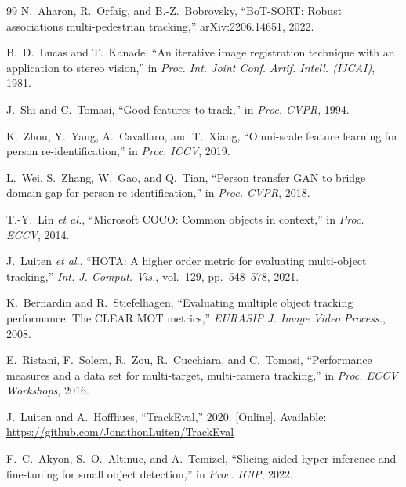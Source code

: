 \documentclass[fontsize=13pt,a4paper,oneside,parskip=false,numbers=noenddot,bibliography=totoc]{scrreprt}
\begin{document}
\begin{thebibliography}{99}
N.~Aharon, R.~Orfaig, and B.-Z.~Bobrovsky, ``BoT-SORT: Robust associations multi-pedestrian tracking,'' arXiv:2206.14651, 2022.

B.~D.~Lucas and T.~Kanade, ``An iterative image registration technique with an application to stereo vision,'' in \textit{Proc. Int. Joint Conf. Artif. Intell. (IJCAI)}, 1981.

J.~Shi and C.~Tomasi, ``Good features to track,'' in \textit{Proc. CVPR}, 1994.

K.~Zhou, Y.~Yang, A.~Cavallaro, and T.~Xiang, ``Omni-scale feature learning for person re-identification,'' in \textit{Proc. ICCV}, 2019.

L.~Wei, S.~Zhang, W.~Gao, and Q.~Tian, ``Person transfer GAN to bridge domain gap for person re-identification,'' in \textit{Proc. CVPR}, 2018.

T.-Y.~Lin \textit{et al.}, ``Microsoft COCO: Common objects in context,'' in \textit{Proc. ECCV}, 2014.

J.~Luiten \textit{et al.}, ``HOTA: A higher order metric for evaluating multi-object tracking,'' \textit{Int. J. Comput. Vis.}, vol.~129, pp.~548--578, 2021.

K.~Bernardin and R.~Stiefelhagen, ``Evaluating multiple object tracking performance: The CLEAR MOT metrics,'' \textit{EURASIP J. Image Video Process.}, 2008.

E.~Ristani, F.~Solera, R.~Zou, R.~Cucchiara, and C.~Tomasi, ``Performance measures and a data set for multi-target, multi-camera tracking,'' in \textit{Proc. ECCV Workshops}, 2016.

J.~Luiten and A.~Hoffhues, ``TrackEval,'' 2020. [Online]. Available: \url{https://github.com/JonathonLuiten/TrackEval}

F.~C.~Akyon, S.~O.~Altinuc, and A.~Temizel, ``Slicing aided hyper inference and fine-tuning for small object detection,'' in \textit{Proc. ICIP}, 2022.

\end{thebibliography}

\appendix
\renewcommand{\thetable}{\thechapter.\arabic{table}}
\renewcommand{\thefigure}{\thechapter.\arabic{figure}}
\renewcommand{\theHtable}{appendix.\thechapter.\arabic{table}}
\renewcommand{\theHfigure}{appendix.\thechapter.\arabic{figure}}
\end{document}

